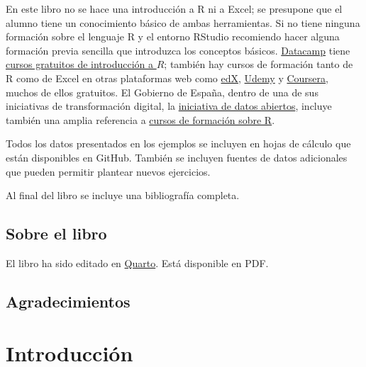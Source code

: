 \documentclass[
  letterpaper,
  DIV=11,
  numbers=noendperiod,
  oneside]{scrreprt}
\begin{document}

En este libro no se hace una introducción a R ni a Excel; se presupone
que el alumno tiene un conocimiento básico de ambas herramientas. Si no
tiene ninguna formación sobre el lenguaje R y el entorno RStudio
recomiendo hacer alguna formación previa sencilla que introduzca los
conceptos básicos. \href{https://www.datacamp.com/}{Datacamp} tiene
\href{https://www.datacamp.com/courses/free-introduction-to-r}{cursos
gratuitos de introducción a \(R\)}; también hay cursos de formación
tanto de R como de Excel en otras plataformas web como
\href{https://www.edx.org/}{edX},
\href{https://www.udemy.com/course/curso-de-introduccion-a-r/}{Udemy} y
\href{https://es.coursera.org/courses?query=r}{Coursera}, muchos de
ellos gratuitos. El Gobierno de España, dentro de una de sus iniciativas
de transformación digital, la \href{https://datos.gob.es/es}{iniciativa
de datos abiertos}, incluye también una amplia referencia a
\href{https://datos.gob.es/es/noticia/cursos-para-aprender-mas-sobre-r}{cursos
de formación sobre R}.

Todos los datos presentados en los ejemplos se incluyen en hojas de
cálculo que están disponibles en GitHub. También se incluyen fuentes de
datos adicionales que pueden permitir plantear nuevos ejercicios.

Al final del libro se incluye una bibliografía completa.

\hypertarget{sobre-el-libro}{%
\section*{Sobre el libro}\label{sobre-el-libro}}


El libro ha sido editado en \href{https://quarto.org/}{Quarto}. Está
disponible en PDF.

\hypertarget{agradecimientos}{%
\section*{Agradecimientos}\label{agradecimientos}}



\hypertarget{introducciuxf3n}{%
\chapter{Introducción}\label{introducciuxf3n}}
\end{document}
